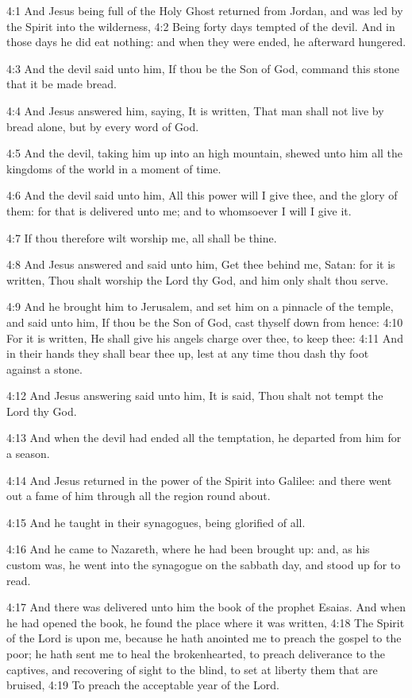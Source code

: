 4:1 And Jesus being full of the Holy Ghost returned from Jordan, and
was led by the Spirit into the wilderness, 4:2 Being forty days
tempted of the devil. And in those days he did eat nothing: and when
they were ended, he afterward hungered.

4:3 And the devil said unto him, If thou be the Son of God, command
this stone that it be made bread.

4:4 And Jesus answered him, saying, It is written, That man shall not
live by bread alone, but by every word of God.

4:5 And the devil, taking him up into an high mountain, shewed unto
him all the kingdoms of the world in a moment of time.

4:6 And the devil said unto him, All this power will I give thee, and
the glory of them: for that is delivered unto me; and to whomsoever I
will I give it.

4:7 If thou therefore wilt worship me, all shall be thine.

4:8 And Jesus answered and said unto him, Get thee behind me, Satan:
for it is written, Thou shalt worship the Lord thy God, and him only
shalt thou serve.

4:9 And he brought him to Jerusalem, and set him on a pinnacle of the
temple, and said unto him, If thou be the Son of God, cast thyself
down from hence: 4:10 For it is written, He shall give his angels
charge over thee, to keep thee: 4:11 And in their hands they shall
bear thee up, lest at any time thou dash thy foot against a stone.

4:12 And Jesus answering said unto him, It is said, Thou shalt not
tempt the Lord thy God.

4:13 And when the devil had ended all the temptation, he departed from
him for a season.

4:14 And Jesus returned in the power of the Spirit into Galilee: and
there went out a fame of him through all the region round about.

4:15 And he taught in their synagogues, being glorified of all.

4:16 And he came to Nazareth, where he had been brought up: and, as
his custom was, he went into the synagogue on the sabbath day, and
stood up for to read.

4:17 And there was delivered unto him the book of the prophet Esaias.
And when he had opened the book, he found the place where it was
written, 4:18 The Spirit of the Lord is upon me, because he hath
anointed me to preach the gospel to the poor; he hath sent me to heal
the brokenhearted, to preach deliverance to the captives, and
recovering of sight to the blind, to set at liberty them that are
bruised, 4:19 To preach the acceptable year of the Lord.

